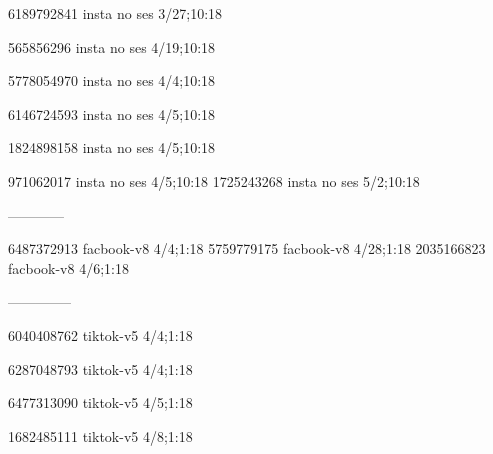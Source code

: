 6189792841 insta no ses
3/27;10:18

565856296 insta no ses
4/19;10:18

5778054970 insta no ses
4/4;10:18

6146724593 insta no ses
4/5;10:18

1824898158 insta no ses
4/5;10:18

971062017 insta no ses
4/5;10:18
1725243268 insta no ses
5/2;10:18

------------

6487372913 facbook-v8
4/4;1:18
5759779175 facbook-v8
4/28;1:18
2035166823 facbook-v8
4/6;1:18

--------------

6040408762 tiktok-v5
4/4;1:18

6287048793 tiktok-v5
4/4;1:18

6477313090 tiktok-v5
4/5;1:18

1682485111 tiktok-v5
4/8;1:18

